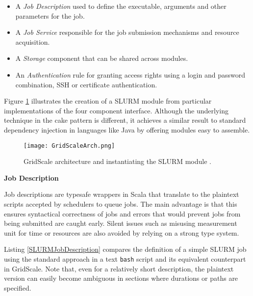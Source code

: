 \begin{itemize}
	\item A \textit{Job Description} used to define the executable, arguments and other parameters for the job.
	\item A \textit{Job Service} responsible for the job submission mechanisms and resource acquisition.
	\item A \textit{Storage} component that can be shared across modules.
	\item An \textit{Authentication} rule for granting access rights using a login and password combination, SSH or certificate authentication.
\end{itemize}

Figure \ref{GridScaleArch} illustrates the creation of a SLURM module from particular implementations of the four component interface. Although the underlying technique in the cake pattern is different, it achieves a similar result to standard dependency injection in languages like Java by offering modules easy to assemble.

\begin{figure}[h]
	\centering
		\texttt{[image: GridScaleArch.png]}
	\caption{GridScale architecture and instantiating the SLURM module \cite{Reuillon2016}.}
	\label{GridScaleArch}
\end{figure}

\vspace{4mm}
\textbf{Job Description}
\vspace{1mm}

Job descriptions are typesafe wrappers in Scala that translate to the plaintext scripts accepted by schedulers to queue jobs. The main advantage is that this ensures syntactical correctness of jobs and errors that would prevent jobs from being submitted are caught early. Silent issues such as misusing measurement unit for time or resources are also avoided by relying on a strong type system. 

Listing \ref{SLURMJobDescription} compares the definition of a simple SLURM job using the standard approach in a text \verb|bash| script and its equivalent counterpart in GridScale. Note that, even for a relatively short description, the plaintext version can easily become ambiguous in sections where durations or paths are specified.

